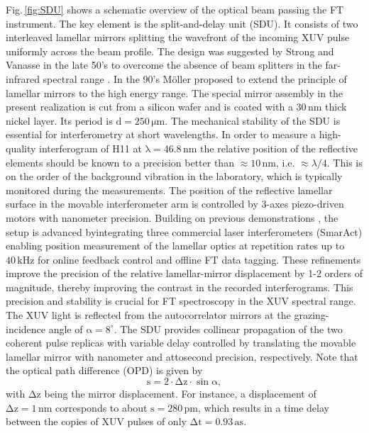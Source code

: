 \documentclass[fleqn,10pt]{wlscirep}
\begin{document}
\newpage
Fig.\,\ref{fig:SDU} shows a schematic overview of the optical beam passing the FT instrument. The key element is the split-and-delay unit (SDU). It consists of two interleaved lamellar mirrors splitting the wavefront of the incoming XUV pulse uniformly across the beam profile. The design was suggested by Strong and Vanasse in the late 50's to overcome the absence of beam splitters in the far-infrared spectral range \cite{Strong1960}. In the 90's Möller proposed to extend the principle of lamellar mirrors to the high energy range\cite{Moeller1995}. The special mirror assembly in the present realization is cut from a silicon wafer and is coated with a $\mathrm{30\,nm}$ thick nickel layer. Its period is $\mathrm{d=250\,\mu m}$. The mechanical stability of the SDU is essential for interferometry at short wavelengths. In order to measure a high-quality interferogram of H11 at $\mathrm{\lambda=46.8\,nm}$ the relative position of the reflective elements should be known to a precision better than $\mathrm{\approx10\,nm}$, i.e. $\approx\lambda/4$. This is on the order of the background vibration in the laboratory, which is typically monitored during the measurements. The position of the reflective lamellar surface in the movable interferometer arm is controlled by 3-axes piezo-driven motors with nanometer precision. Building on previous demonstrations \cite{UsenkoASB17,UsenkoNAT17}, the setup is advanced byintegrating three commercial laser interferometers (SmarAct) enabling position measurement of the lamellar optics at repetition rates up to $\mathrm{40\,kHz}$ for online feedback control and offline FT data tagging. These refinements improve the precision of the relative lamellar-mirror displacement by 1-2 orders of magnitude, thereby improving the contrast in the recorded interferograms. This precision and stability is crucial for FT spectroscopy in the XUV spectral range. The XUV light is reflected from the autocorrelator mirrors at the grazing-incidence angle of $\mathrm{\alpha=8^{\circ}}$. The SDU provides collinear propagation of the two coherent pulse replicas with variable delay controlled by translating the movable lamellar mirror with nanometer and attosecond precision, respectively. Note that the optical path difference (OPD) is given by
\begin{equation}
\mathrm{s=2\cdot \Delta z\cdot \sin{\alpha}},
\end{equation}
with $\mathrm{\Delta z}$ being the mirror displacement. For instance, a displacement of $\mathrm{\Delta z = 1\,nm}$ corresponds to about $\mathrm{s=280\,pm}$, which results in a time delay between the copies of XUV pulses of only $\mathrm{\Delta t=0.93\,as}$.\\  
\end{document}
